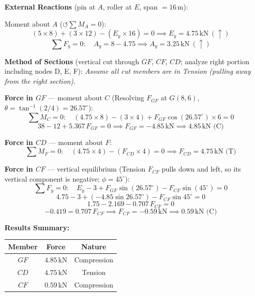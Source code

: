 \documentclass[12pt,a3paper]{article}
\begin{document}
\begin{enumerate}
\begin{tcolorbox}[enhanced,breakable,ansbox,colback=cE!4,colframe=cE,
  boxrule=0.8pt,arc=5pt,
  title={\textbf{Corrected Solution}},fonttitle=\bfseries\color{white},colbacktitle=cE]

\textbf{External Reactions} (pin at $A$, roller at $E$, span $= 16$\,m):

Moment about $A$ ($\circlearrowleft\sum M_A = 0$):
\[
  (5\times 8) + (3\times 12) - (E_y\times 16) = 0
  \implies \boxed{E_y = 4.75\,\text{kN}\ (\uparrow)}
\]
\[
  \sum F_y = 0\colon\quad A_y = 8 - 4.75
  \implies \boxed{A_y = 3.25\,\text{kN}\ (\uparrow)}
\]

\medskip
\textbf{Method of Sections} (vertical cut through $GF$, $CF$, $CD$;
analyze right portion including nodes D, E, F):
\textit{Assume all cut members are in Tension (pulling away from the right section).}

\medskip
\textbf{Force in $GF$} --- moment about $C$
(Resolving $F_{GF}$ at $G(8,6)$, $\theta = \tan^{-1}(2/4) = 26.57^\circ$):
\[
  \sum M_C = 0\colon\quad
  (4.75\times 8) - (3\times 4) + F_{GF}\cos(26.57^\circ)\times 6 = 0
\]
\[
  38 - 12 + 5.367\,F_{GF} = 0
  \implies \boxed{F_{GF} = -4.85\,\text{kN} \implies 4.85\,\text{kN (C)}}
\]

\medskip
\textbf{Force in $CD$} --- moment about $F$:
\[
  \sum M_F = 0\colon\quad
  (4.75\times 4) - (F_{CD}\times 4) = 0
  \implies \boxed{F_{CD} = 4.75\,\text{kN (T)}}
\]

\medskip
\textbf{Force in $CF$} --- vertical equilibrium
(Tension $F_{CF}$ pulls down and left, so its vertical component is negative; $\phi = 45^\circ$):
\[
  \sum F_y = 0\colon\quad
  E_y - 3 + F_{GF}\sin(26.57^\circ) - F_{CF}\sin(45^\circ) = 0
\]
\[
  4.75 - 3 + (-4.85\sin 26.57^\circ) - F_{CF}\sin 45^\circ = 0
\]
\[
  1.75 - 2.169 - 0.707\,F_{CF} = 0
\]
\[
  -0.419 = 0.707\,F_{CF}
  \implies \boxed{F_{CF} = -0.59\,\text{kN} \implies 0.59\,\text{kN (C)}}
\]

\medskip
\textbf{Results Summary:}
\begin{center}
\begin{tabular}{ccc}
\toprule
\textbf{Member} & \textbf{Force} & \textbf{Nature} \\
\midrule
$GF$ & $4.85$\,kN & Compression \\
$CD$ & $4.75$\,kN & Tension \\
$CF$ & $0.59$\,kN & Compression \\
\bottomrule
\end{tabular}
\end{center}


\end{tcolorbox}
\end{enumerate}
\end{document}
